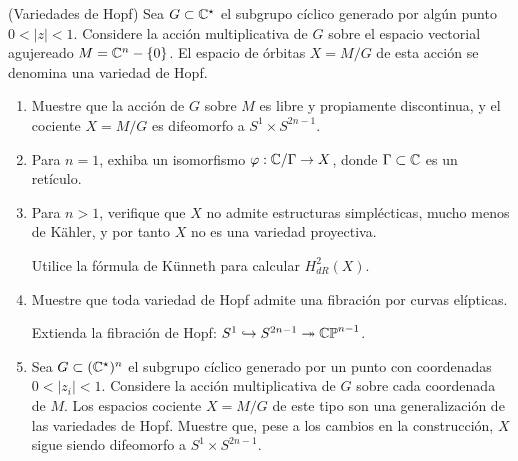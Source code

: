 \begin{exercise}
(Variedades de Hopf) Sea $G \subset \mathbb C^\star$ el subgrupo cíclico generado por algún punto $0 < |z| < 1$. Considere la acción multiplicativa de $G$ sobre el espacio vectorial agujereado $M = \mathbb C^n - \{ 0 \}$. El espacio de órbitas $X = M/G$ de esta acción se denomina una variedad de Hopf.

\begin{enumerate}[label=\alph*)]
    \item Muestre que la acción de $G$ sobre $M$ es libre y propiamente discontinua, y el cociente $X = M/G$ es difeomorfo a $S^1 \times S^{2n-1}$.
    
    \item Para $n = 1$, exhiba un isomorfismo $\varphi : \mathbb C/\Gamma \to X$, donde $\Gamma \subset \mathbb C$ es un retículo.
    
    \item Para $n > 1$, verifique que $X$ no admite estructuras simplécticas, mucho menos de Kähler, y por tanto $X$ no es una variedad proyectiva.
    
    \begin{hint}
    Utilice la fórmula de Künneth para calcular $H_{dR}^2(X)$.
    \end{hint}
    
    \item Muestre que toda variedad de Hopf admite una fibración por curvas elípticas.
    
    \begin{hint}
    Extienda la fibración de Hopf: $S^1 \hookrightarrow S^{2n-1} \twoheadrightarrow \mathbb {CP}^{n-1}$.
    \end{hint}
    
    \item Sea $G \subset (\mathbb C^\star)^n$ el subgrupo cíclico generado por un punto con coordenadas $0 < |z_i| < 1$. Considere la acción multiplicativa de $G$ sobre cada coordenada de $M$. Los espacios cociente $X = M/G$ de este tipo son una generalización de las variedades de Hopf. Muestre que, pese a los cambios en la construcción, $X$ sigue siendo difeomorfo a $S^1 \times S^{2n-1}$.
\end{enumerate}
\end{exercise}

